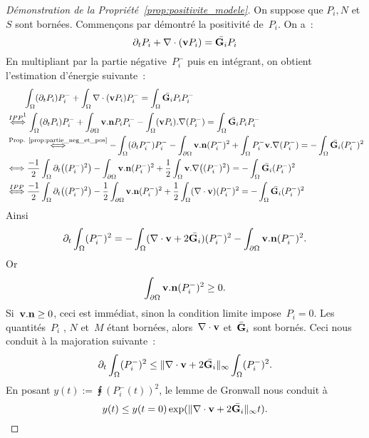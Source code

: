 \documentclass[main.tex]{subfiles}
\begin{document}
\begin{proof}[Démonstration de la Propriété~\ref{prop:positivite_modele}]
On suppose que $P_i,N$ et $S$ sont bornées. Commençons par démontré la positivité de~$P_i$. On a~:
$$\partial_t P_i + \nabla\cdot (\mathbf{v} P_i) = \bar{{\bf G}_i}P_i $$
En multipliant par la partie négative~$P_i^-$ puis en intégrant, on obtient l'estimation d'énergie suivante~:
$$
\begin{aligned}
&\qquad \intx (\partial_t P_i) P_i^- + \intx \dive (\vit P_i) P_i^- = \intx \bar{\GG_i} P_i P_i^- \\
&\overset{IPP\protect\footnotemark}{\Longleftrightarrow} \intx (\partial_t P_i) P_i^- + \intbord \vit . \nn P_i P_i^- - \intx (\vit P_i).\nabla (P_i^-)  = \intx \bar{\GG_i} P_i P_i^-  \\
&\overset{\textrm{Prop. \ref{prop:partie_neg_et_pos}}}{\Longleftrightarrow}  - \intx (\partial_t P_i^-) P_i^- - \intbord \vit . \nn (P_i^-)^2 + \intx P_i^- \vit.\nabla (P_i^-)  = - \intx \bar{\GG_i} (P_i^-)^2  \\
&\Longleftrightarrow  \frac{-1}{2} \intx \partial_t \big( (P_i^-)^2 \big) - \intbord \vit . \nn (P_i^-)^2 + \frac{1}{2} \intx \vit.\nabla \big( (P_i^-)^2\big)   = - \intx \bar{\GG_i} (P_i^-)^2  \\
&\overset{IPP}{\Longleftrightarrow}  \frac{-1}{2} \intx \partial_t \big( (P_i^-)^2 \big) -\frac{1}{2} \intbord \vit . \nn (P_i^-)^2 + \frac{1}{2} \intx (\dive \vit)  (P_i^-)^2  = - \intx \bar{\GG_i} (P_i^-)^2  \\
\end{aligned}$$
Ainsi
\begin{equation}
\partial_t \int_\Omega (P_i^-)^2  = - \int_\Omega (\nabla\cdot \mathbf{v} + 2\bar{{\bf G}_i})  (P_i^-)^2 - \int_{\partial \Omega} \mathbf{v} . {\bf n} (P_i^-)^2.
\end{equation}
Or $$\int_{\partial \Omega} \mathbf{v} . {\bf n} (P_i^-)^2 \geq 0. $$
Si~$\mathbf{v}.{\bf n}\geq0$, ceci est immédiat, sinon la condition limite impose~$P_i=0$. 
Les quantités~$P_i$ , $N$ et~$M$ étant bornées, alors~$\nabla\cdot \mathbf{v}$ et~$\bar{{\bf G}}_i$ sont bornés. Ceci nous conduit à la majoration suivante~:
\begin{equation}
\partial_t \int_\Omega (P_i^-)^2 \leq \| \nabla\cdot \mathbf{v} + 2\bar{{\bf G}_i} \|_{\infty} \int_\Omega (P_i^-)^2.
\end{equation}
En posant $y(t):=\intx (P_i^-(t))^2$, le lemme de Gronwall nous conduit à
\begin{equation}
y(t) \leq y(t=0) \exp ( \| \nabla\cdot \mathbf{v} + 2\bar{{\bf G}_i} \|_{\infty} t  ).
\end{equation}

\end{proof}
\end{document}
